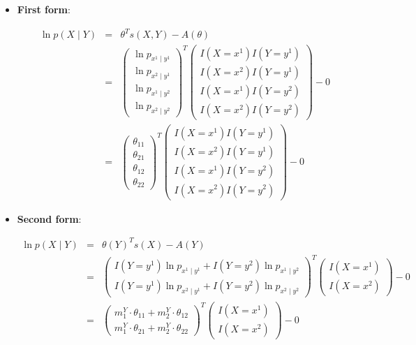 \documentclass[11pt, oneside]{article}   	%
\numberwithin{figure}{section}
\numberwithin{equation}{section}
\numberwithin{table}{section}
\begin{document}
\begin{itemize}

\item \textbf{First form}:

\begin{eqnarray*}
\ln p(X \mid Y) &=& \theta^T s(X,Y) - A(\theta) \\
&=&
\begin{pmatrix}
\ln p_{x^1 \mid y^1}\\
\ln p_{x^2 \mid y^1}\\
\ln p_{x^1 \mid y^2}\\
\ln p_{x^2 \mid y^2}
\end{pmatrix}^T
\begin{pmatrix}
I(X=x^1)I(Y=y^1) \\
I(X=x^2)I(Y=y^1) \\
I(X=x^1)I(Y=y^2) \\
I(X=x^2)I(Y=y^2) 
\end{pmatrix}
- 0\\
&=&
\begin{pmatrix}
\theta_{11}\\
\theta_{21}\\
\theta_{12}\\
\theta_{22}
\end{pmatrix}^T
\begin{pmatrix}
I(X=x^1)I(Y=y^1) \\
I(X=x^2)I(Y=y^1) \\
I(X=x^1)I(Y=y^2) \\
I(X=x^2)I(Y=y^2) 
\end{pmatrix}
- 0
\end{eqnarray*}

\item \textbf{Second form}:

\begin{eqnarray*}
\ln p(X \mid Y) &=& \theta(Y)^Ts(X) - A(Y) \\
&=&
\begin{pmatrix}
I(Y=y^1)\ln p_{x^1 \mid y^1}  + I(Y=y^2)\ln p_{x^1 \mid y^2}\\
I(Y=y^1)\ln p_{x^2 \mid y^1}  + I(Y=y^2)\ln p_{x^2 \mid y^2}
\end{pmatrix}^T
\begin{pmatrix}
I(X=x^1) \\
I(X=x^2)
\end{pmatrix}
- 0 \\
&=&
\begin{pmatrix}
m^Y_1\cdot\theta_{11}  + m^Y_2\cdot\theta_{12}\\
m^Y_1\cdot\theta_{21}  + m^Y_2\cdot\theta_{22}
\end{pmatrix}^T
\begin{pmatrix}
I(X=x^1) \\
I(X=x^2)
\end{pmatrix}
- 0 
\end{eqnarray*}


\end{itemize}
\end{document}

